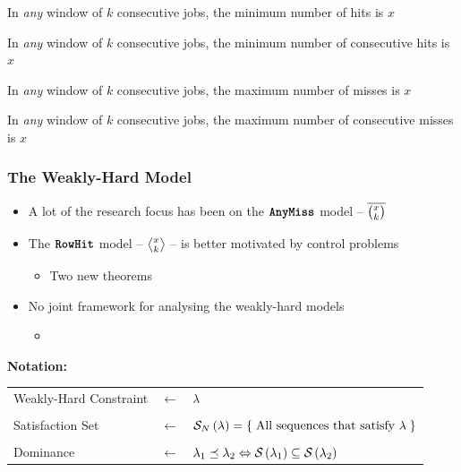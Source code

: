 \begin{frame}
    \begin{minipage}[c]{0.23\textwidth}
        \centering
        In \emph{any} window of $k$ consecutive jobs, the minimum number of hits is $x$
    \end{minipage}\hfill
    \begin{minipage}[c]{0.23\textwidth}
        \centering
        In \emph{any} window of $k$ consecutive jobs, the minimum number of consecutive hits is $x$
    \end{minipage}\hfill
    \begin{minipage}[c]{0.23\textwidth}
        \centering
        In \emph{any} window of $k$ consecutive jobs, the maximum number of misses is $x$
    \end{minipage}\hfill
    \begin{minipage}[c]{0.23\textwidth}
        \centering
        In \emph{any} window of $k$ consecutive jobs, the maximum number of consecutive misses is $x$
    \end{minipage}
\end{frame}

\begin{frame}
    \frametitle{The Weakly-Hard Model}

    \vspace{0.5cm}

    \begin{itemize}
        \item A lot of the research focus has been on the $\texttt{\textbf{AnyMiss}}{}$ model -- $\overline{\binom{x_{}}{k_{}}}$
        \item The $\texttt{\textbf{RowHit}}{}$ model -- $\rowhit{}$ -- is better motivated by control problems~\cite{Linsenmayer:2021,Vreman:2021}
            \begin{itemize}
                \item Two new theorems
            \end{itemize}
        \item No joint framework for analysing the weakly-hard models
            \begin{itemize}
                \item \tool{}
            \end{itemize}
    \end{itemize}

    \textbf{Notation:} 

    \begin{center}
        \begin{tabular}{lll}
            Weakly-Hard Constraint & $\leftarrow$ & $\lambda$ \\
             & & \\
            Satisfaction Set & $\leftarrow$ & $\mathcal{S}_{N}\left( \lambda \right) = \left\{ \; \text{All sequences that satisfy } \lambda \;\right\}$ \\
             & & \\
            Dominance & $\leftarrow$ & $\lambda_1 \preceq \lambda_2 \Leftrightarrow \mathcal{S}_{}\left( \lambda_1 \right) \subseteq \mathcal{S}_{}\left( \lambda_2 \right)$
        \end{tabular}
    \end{center}
\end{frame}

